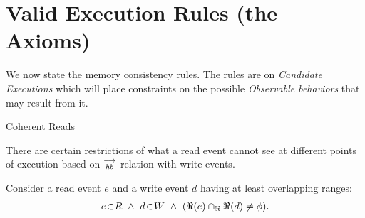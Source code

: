         
    \section{Valid Execution Rules (the Axioms)}
        We now state the memory consistency rules. The rules are on \textit{Candidate Executions} which will place constraints on the possible \textit{Observable behaviors} that may result from it. 
         
        \begin{axiom}{Coherent Reads} 
            \label{CoRe}
        
            There are certain restrictions of what a read event cannot see at different points of execution based on $\stackrel{\longrightarrow}{_{hb}}$ relation with write events. 

            Consider a read event $e$ and a write event $d$ having at least overlapping ranges:
            \begin{align*}
                \event{e}{R} \ \wedge \ 
                \event{d}{W} \ \wedge \
                (\Re(e) \cap_\Re \Re(d) \neq \phi).
            \end{align*}


\end{axiom}
